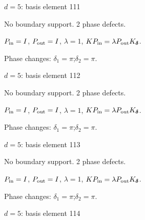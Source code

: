 \vfill
{\footnotesize\texttt{}}
\newpage
{}
{\Large $d=5$: basis element 111}\par
No boundary support. 2 phase defects.
\begin{center}
\end{center}
\vspace{-1mm}
$P_{\rm in}=I$, \quad $P_{\rm out}=I$, \quad $\lambda=1$, \qquad $K P_{\rm in}=\lambda P_{\rm out}K_{\boldsymbol\delta}$.
\par\smallskip\begin{minipage}{.98\linewidth}\small Phase changes: $\delta_{1}=\pi$;\quad $\delta_{2}=\pi$.\end{minipage}
\vfill
{\footnotesize\texttt{}}
\newpage
{}
{\Large $d=5$: basis element 112}\par
No boundary support. 2 phase defects.
\begin{center}
\end{center}
\vspace{-1mm}
$P_{\rm in}=I$, \quad $P_{\rm out}=I$, \quad $\lambda=1$, \qquad $K P_{\rm in}=\lambda P_{\rm out}K_{\boldsymbol\delta}$.
\par\smallskip\begin{minipage}{.98\linewidth}\small Phase changes: $\delta_{1}=\pi$;\quad $\delta_{2}=\pi$.\end{minipage}
\vfill
{\footnotesize\texttt{}}
\newpage
{}
{\Large $d=5$: basis element 113}\par
No boundary support. 2 phase defects.
\begin{center}
\end{center}
\vspace{-1mm}
$P_{\rm in}=I$, \quad $P_{\rm out}=I$, \quad $\lambda=1$, \qquad $K P_{\rm in}=\lambda P_{\rm out}K_{\boldsymbol\delta}$.
\par\smallskip\begin{minipage}{.98\linewidth}\small Phase changes: $\delta_{1}=\pi$;\quad $\delta_{2}=\pi$.\end{minipage}
\vfill
{\footnotesize\texttt{}}
\newpage
{}
{\Large $d=5$: basis element 114}\par

